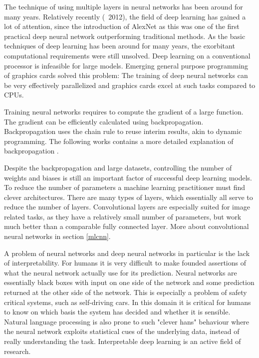 \documentclass[draft,final,oneside]{vutinfth} %
\begin{document}
The technique of using multiple layers in neural networks has been around for many years. Relatively recently (~2012), the field of deep learning has gained a lot of attention, since the introduction of AlexNet as this was one of the first practical deep neural network outperforming traditional methods. As the basic techniques of deep learning has been around for many years, the exorbitant computational requirements were still unsolved. Deep learning on a conventional processor is infeasible for large models. Emerging general purpose programming of graphics cards solved this problem: The training of deep neural networks can be very effectively parallelized and graphics cards excel at such tasks compared to CPUs. 

Training neural networks requires to compute the gradient of a large function. The gradient can be efficiently calculated using backpropagation. Backpropagation uses the chain rule to reuse interim results, akin to dynamic programming. The following works contains a more detailed explanation of backpropagation \cite{Goodfellow-et-al-2016}.

Despite the backpropagation and large datasets, controlling the number of weights and biases is still an important factor of successful deep learning models. To reduce the number of parameters a machine learning practitioner must find clever architectures. There are many types of layers, which essentially all serve to reduce the number of layers. Convolutional layers are especially suited for image related tasks, as they have a relatively small number of parameters, but work much better than a comparable fully connected layer. More about convolutional neural networks in section \ref{mlcnn}.

A problem of neural networks and deep neural networks in particular is the lack of interpretability. For humans it is very difficult to make founded assertions of what the neural network actually use for its prediction. Neural networks are essentially black boxes with input on one side of the network and some prediction returned at the other side of the network. This is especially a problem of safety critical systems, such as self-driving cars. In this domain it is critical for humans to know on which basis the system has decided and whether it is sensible. Natural language processing is also prone to such "clever hans" behaviour \cite{cleverhans} where the neural network exploits statistical cues of the underlying data, instead of really understanding the task. Interpretable deep learning is an active field of research. \cite{interpretabledl}
\end{document}

